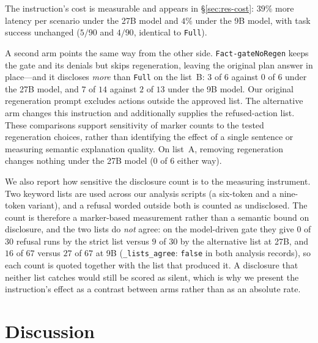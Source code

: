 \documentclass[11pt]{article}
\begin{document}
The instruction's cost is measurable and appears in \S\ref{sec:res-cost}: $39\%$ more
latency per scenario under the 27B model and $4\%$ under the 9B model, with task success
unchanged ($5/90$ and $4/90$, identical to \texttt{Full}).

A second arm points the same way from the other side. \texttt{Fact-gateNoRegen} keeps
the gate and its denials but skips regeneration, leaving the original plan answer in
place---and it discloses \emph{more} than \texttt{Full} on the list~B: $3$ of $6$
against $0$ of $6$ under the 27B model, and $7$ of $14$ against $2$ of $13$ under the 9B
model. Our original regeneration prompt excludes actions outside the approved list.
The alternative arm changes this instruction and additionally supplies the refused-action
list. These comparisons support sensitivity of marker counts to the tested regeneration
choices, rather than identifying the effect of a single sentence or measuring semantic
explanation quality. On list~A, removing regeneration changes nothing under the 27B
model ($0$ of $6$ either way).

We also report how sensitive the disclosure count is to the measuring instrument.
Two keyword lists are used across our analysis scripts (a six-token and a
nine-token variant), and a refusal worded outside both is counted as undisclosed.
The count is therefore a marker-based measurement rather than a semantic bound on disclosure, and the two lists do \emph{not} agree: on the model-driven gate they give $0$ of $30$
refusal runs by the strict list versus $9$ of $30$ by the alternative list at 27B, and
$16$ of $67$ versus $27$ of $67$ at 9B (\texttt{\_lists\_agree}: \texttt{false} in both
analysis records), so each count is quoted together with the list that produced it.
A disclosure that neither
list catches would still be scored as silent, which is why we present the
instruction's effect as a contrast between arms rather than as an absolute rate.

\section{Discussion}
\label{sec:discussion}
\end{document}

